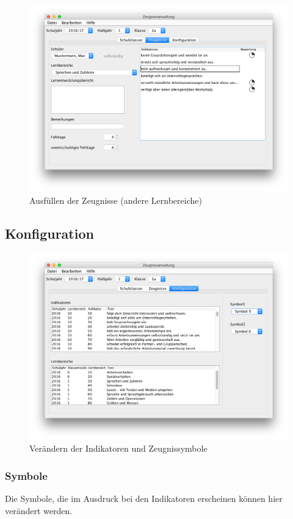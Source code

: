\documentclass[a4paper,notitlepage,parskip]{scrartcl}
\begin{document}
\begin{figure}[ht]
\centering
\centerline{\includegraphics[width=1.0\textwidth]{Zeugnisse2}}
\caption{Ausfüllen der Zeugnisse (andere Lernbereiche)}
\label{fig:Zeugnisse2}
\end{figure}

\subsection{Konfiguration}
\begin{figure}[ht]
\centering
\centerline{\includegraphics[width=1.0\textwidth]{Konfiguration}}
\caption{Verändern der Indikatoren und Zeugnissymbole}
\label{fig:Konfiguration}
\end{figure}
\subsubsection{Symbole}
Die Symbole, die im Ausdruck bei den Indikatoren erscheinen können hier verändert werden.
\end{document}
